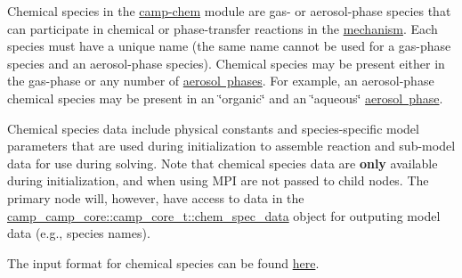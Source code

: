 Chemical species in the \mbox{\hyperlink{index}{camp-\/chem}} module are gas-\/ or aerosol-\/phase species that can participate in chemical or phase-\/transfer reactions in the \mbox{\hyperlink{camp_mechanism}{mechanism}}. Each species must have a unique name (the same name cannot be used for a gas-\/phase species and an aerosol-\/phase species). Chemical species may be present either in the gas-\/phase or any number of \mbox{\hyperlink{camp_aero_phase}{aerosol phases}}. For example, an aerosol-\/phase chemical species may be present in an \char`\"{}organic\char`\"{} and an \char`\"{}aqueous\char`\"{} \mbox{\hyperlink{camp_aero_phase}{aerosol phase}}.

Chemical species data include physical constants and species-\/specific model parameters that are used during initialization to assemble reaction and sub-\/model data for use during solving. Note that chemical species data are {\bfseries{only}} available during initialization, and when using MPI are not passed to child nodes. The primary node will, however, have access to data in the {\ttfamily \mbox{\hyperlink{structcamp__camp__core_1_1camp__core__t_a6d0ccab2236a905514a49ee0a73dc557}{camp\+\_\+camp\+\_\+core\+::camp\+\_\+core\+\_\+t\+::chem\+\_\+spec\+\_\+data}}} object for outputing model data (e.\+g., species names).

The input format for chemical species can be found \mbox{\hyperlink{input_format_species}{here}}. 